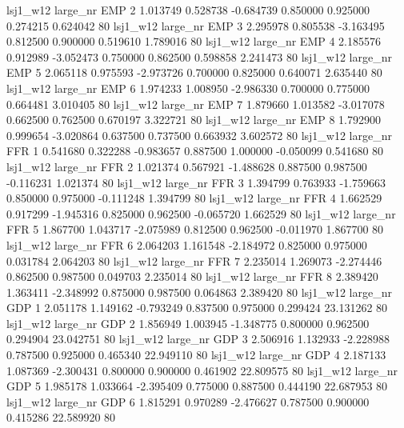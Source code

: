     lsj1_w12   large_nr      EMP                 2  1.013749  0.528738  -0.684739 0.850000 0.925000  0.274215    0.624042 80
    lsj1_w12   large_nr      EMP                 3  2.295978  0.805538  -3.163495 0.812500 0.900000  0.519610    1.789016 80
    lsj1_w12   large_nr      EMP                 4  2.185576  0.912989  -3.052473 0.750000 0.862500  0.598858    2.241473 80
    lsj1_w12   large_nr      EMP                 5  2.065118  0.975593  -2.973726 0.700000 0.825000  0.640071    2.635440 80
    lsj1_w12   large_nr      EMP                 6  1.974233  1.008950  -2.986330 0.700000 0.775000  0.664481    3.010405 80
    lsj1_w12   large_nr      EMP                 7  1.879660  1.013582  -3.017078 0.662500 0.762500  0.670197    3.322721 80
    lsj1_w12   large_nr      EMP                 8  1.792900  0.999654  -3.020864 0.637500 0.737500  0.663932    3.602572 80
    lsj1_w12   large_nr      FFR                 1  0.541680  0.322288  -0.983657 0.887500 1.000000 -0.050099    0.541680 80
    lsj1_w12   large_nr      FFR                 2  1.021374  0.567921  -1.488628 0.887500 0.987500 -0.116231    1.021374 80
    lsj1_w12   large_nr      FFR                 3  1.394799  0.763933  -1.759663 0.850000 0.975000 -0.111248    1.394799 80
    lsj1_w12   large_nr      FFR                 4  1.662529  0.917299  -1.945316 0.825000 0.962500 -0.065720    1.662529 80
    lsj1_w12   large_nr      FFR                 5  1.867700  1.043717  -2.075989 0.812500 0.962500 -0.011970    1.867700 80
    lsj1_w12   large_nr      FFR                 6  2.064203  1.161548  -2.184972 0.825000 0.975000  0.031784    2.064203 80
    lsj1_w12   large_nr      FFR                 7  2.235014  1.269073  -2.274446 0.862500 0.987500  0.049703    2.235014 80
    lsj1_w12   large_nr      FFR                 8  2.389420  1.363411  -2.348992 0.875000 0.987500  0.064863    2.389420 80
    lsj1_w12   large_nr      GDP                 1  2.051178  1.149162  -0.793249 0.837500 0.975000  0.299424   23.131262 80
    lsj1_w12   large_nr      GDP                 2  1.856949  1.003945  -1.348775 0.800000 0.962500  0.294904   23.042751 80
    lsj1_w12   large_nr      GDP                 3  2.506916  1.132933  -2.228988 0.787500 0.925000  0.465340   22.949110 80
    lsj1_w12   large_nr      GDP                 4  2.187133  1.087369  -2.300431 0.800000 0.900000  0.461902   22.809575 80
    lsj1_w12   large_nr      GDP                 5  1.985178  1.033664  -2.395409 0.775000 0.887500  0.444190   22.687953 80
    lsj1_w12   large_nr      GDP                 6  1.815291  0.970289  -2.476627 0.787500 0.900000  0.415286   22.589920 80
